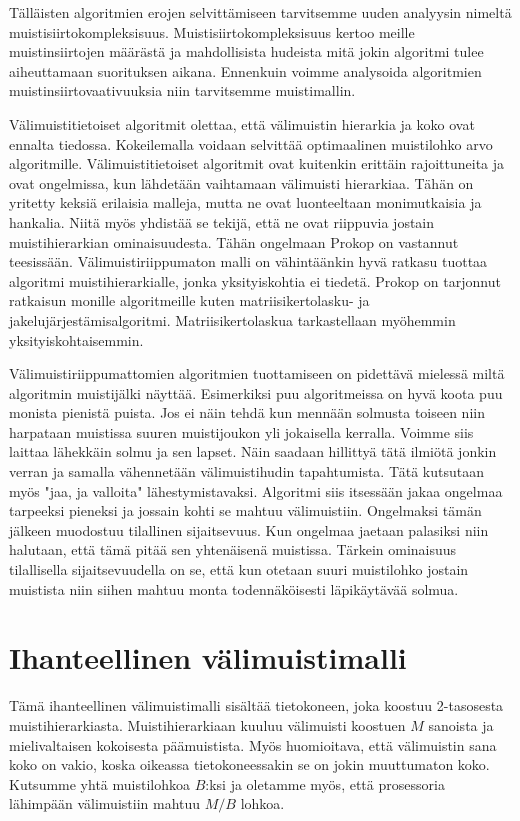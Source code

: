 \documentclass[finnish]{tktltiki2}
\theoremstyle{definition}
\theoremstyle{remark}
\begin{document}
Tälläisten algoritmien erojen selvittämiseen tarvitsemme uuden analyysin
nimeltä muistisiirtokompleksisuus. %
Muistisiirtokompleksisuus kertoo meille muistinsiirtojen määrästä ja
mahdollisista hudeista mitä jokin algoritmi tulee aiheuttamaan suorituksen
aikana. Ennenkuin voimme analysoida
algoritmien muistinsiirtovaativuuksia niin tarvitsemme muistimallin.

Välimuistitietoiset algoritmit olettaa,
että välimuistin hierarkia ja koko ovat ennalta tiedossa. Kokeilemalla voidaan
selvittää optimaalinen muistilohko arvo algoritmille. Välimuistitietoiset
algoritmit ovat kuitenkin erittäin rajoittuneita ja ovat ongelmissa, kun
lähdetään vaihtamaan välimuisti hierarkiaa. Tähän on yritetty keksiä
erilaisia malleja, mutta ne ovat luonteeltaan monimutkaisia ja hankalia. Niitä
myös yhdistää se tekijä, että ne ovat riippuvia jostain muistihierarkian
ominaisuudesta.
Tähän ongelmaan Prokop on vastannut teesissään\cite{prokop99}. Välimuistiriippumaton malli
on vähintäänkin hyvä ratkasu tuottaa algoritmi muistihierarkialle, jonka yksityiskohtia ei tiedetä.
Prokop on tarjonnut ratkaisun monille algoritmeille kuten matriisikertolasku- ja jakelujärjestämisalgoritmi.
Matriisikertolaskua tarkastellaan myöhemmin yksityiskohtaisemmin.

Välimuistiriippumattomien algoritmien tuottamiseen on pidettävä mielessä miltä
algoritmin muistijälki näyttää. Esimerkiksi puu algoritmeissa
on hyvä koota puu monista pienistä puista. Jos ei näin tehdä kun mennään solmusta toiseen niin
harpataan muistissa suuren muistijoukon yli jokaisella kerralla. Voimme siis laittaa lähekkäin solmu ja sen lapset.
Näin saadaan hillittyä tätä ilmiötä jonkin verran ja samalla vähennetään välimuistihudin tapahtumista.
Tätä kutsutaan myös "jaa, ja valloita" lähestymistavaksi. Algoritmi siis itsessään jakaa ongelmaa tarpeeksi pieneksi
ja jossain kohti se mahtuu välimuistiin. Ongelmaksi tämän jälkeen muodostuu tilallinen sijaitsevuus.
Kun ongelmaa jaetaan palasiksi niin halutaan, että tämä pitää sen yhtenäisenä muistissa. Tärkein ominaisuus
tilallisella sijaitsevuudella on se, että kun otetaan suuri muistilohko jostain muistista niin
siihen mahtuu monta todennäköisesti läpikäytävää solmua.





\section{Ihanteellinen välimuistimalli}
Tämä ihanteellinen välimuistimalli sisältää %
tietokoneen, joka koostuu 2-tasosesta muistihierarkiasta. Muistihierarkiaan
kuuluu välimuisti koostuen $ M $ sanoista ja mielivaltaisen
kokoisesta päämuistista. Myös huomioitava, että välimuistin sana koko on
vakio, koska oikeassa tietokoneessakin se on jokin muuttumaton koko.
Kutsumme yhtä muistilohkoa $B$:ksi ja oletamme myös, että prosessoria lähimpään välimuistiin mahtuu $M/B$ lohkoa.
\end{document}

